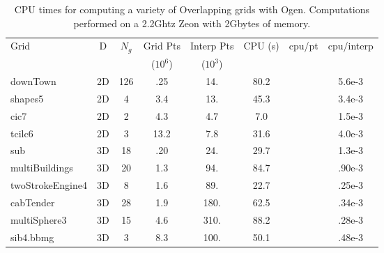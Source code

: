 \documentclass[xcolor=rgb,svgnames,dvipsnames]{article}
\begin{document}
\begin{table}[hbt]
\begin{center}
\begin{tabular}{|l|c|c|c|c|c|c|c|} \hline 
   Grid          & D    & $N_g$ & Grid Pts          & Interp Pts          & CPU (s) & cpu/pt & cpu/interp\\
                 &      &       &          ($10^6$) &            ($10^3$) &         &        &           \\\hline\hline
 downTown        & 2D   & 126   &  .25         &  14.            &  80.2   &        &  5.6e-3    \\
 shapes5         & 2D   & 4     &  3.4         &  13.            &  45.3   &        &  3.4e-3    \\
 cic7            & 2D   & 2     &  4.3         &  4.7            &  7.0    &        &  1.5e-3    \\
 tcilc6          & 2D   &  3    &  13.2        &  7.8            &  31.6   &        &  4.0e-3   \\
\hline
 sub             & 3D   & 18    &  .20         &  24.            &  29.7   &        &  1.3e-3    \\
 multiBuildings  & 3D   & 20    &  1.3         &  94.            &  84.7   &        &  .90e-3    \\
 twoStrokeEngine4& 3D   &  8    &  1.6         &  89.            &  22.7   &        &  .25e-3    \\
   cabTender     & 3D   & 28    &  1.9         &  180.           &  62.5   &        &  .34e-3    \\
multiSphere3     & 3D   & 15    &  4.6         &  310.           &  88.2   &        &  .28e-3    \\
sib4.bbmg        & 3D   & 3     &  8.3         &  100.           &  50.1   &        &  .48e-3    \\
% 
\hline
%
\end{tabular}
\end{center}
\caption{CPU times for computing a variety of Overlapping grids with Ogen. Computations performed on
   a 2.2Ghtz Zeon with 2Gbytes of memory.}
\label{tab:gridGenerationTimings}
\end{table}



\vfill\eject



\printindex
\end{document}
